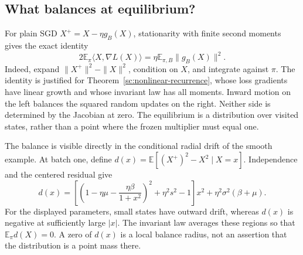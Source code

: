 \subsection{What balances at equilibrium?}
For plain SGD $X^+=X-\eta g_B(X)$, stationarity with finite second moments gives the exact identity
\begin{equation}
 2\mathbb E_\pi\langle X,\nabla L(X)\rangle
 =\eta\mathbb E_{\pi,B}\|g_B(X)\|^2.
 \label{eq:stationary-balance}
\end{equation}
Indeed, expand $\|X^+\|^2-\|X\|^2$, condition on $X$, and integrate against $\pi$. The identity is justified for Theorem~\ref{sc:nonlinear-recurrence}, whose loss gradients have linear growth and whose invariant law has all moments. Inward motion on the left balances the squared random updates on the right. Neither side is determined by the Jacobian at zero. The equilibrium is a distribution over visited states, rather than a point where the frozen multiplier must equal one.

The balance is visible directly in the conditional radial drift of the smooth example. At batch one, define $d(x)=\mathbb E[(X^+)^2-X^2\mid X=x]$. Independence and the centered residual give
\begin{equation}
 d(x)=\left[\left(1-\eta\mu-\frac{\eta\beta}{1+x^2}\right)^2
             +\eta^2s^2-1\right]x^2
       +\eta^2\sigma^2(\beta+\mu).
 \label{eq:exact-radial-drift}
\end{equation}
For the displayed parameters, small states have outward drift, whereas $d(x)$ is negative at sufficiently large $|x|$. The invariant law averages these regions so that $\mathbb E_\pi d(X)=0$. A zero of $d(x)$ is a local balance radius, not an assertion that the distribution is a point mass there.

